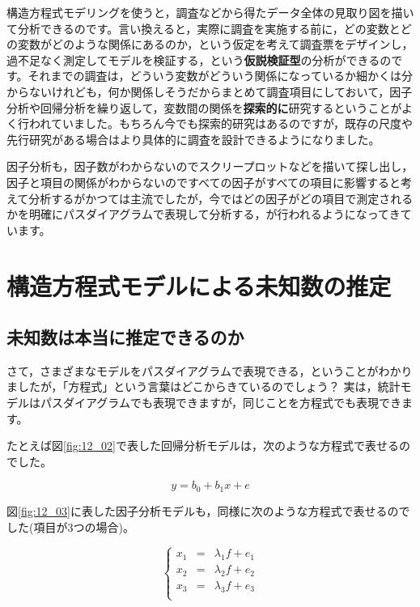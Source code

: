 \documentclass{ltjsbook}
\begin{document}
構造方程式モデリングを使うと，調査などから得たデータ全体の見取り図を描いて分析できるのです。言い換えると，実際に調査を実施する前に，どの変数とどの変数がどのような関係にあるのか，という仮定を考えて調査票をデザインし，過不足なく測定してモデルを検証する，という\textbf{仮説検証型}の分析ができるのです。それまでの調査は，どういう変数がどういう関係になっているか細かくは分からないけれども，何か関係しそうだからまとめて調査項目にしておいて，因子分析や回帰分析を繰り返して，変数間の関係を\textbf{探索的に}研究するということがよく行われていました。もちろん今でも探索的研究はあるのですが，既存の尺度や先行研究がある場合はより具体的に調査を設計できるようになりました。

因子分析も，因子数がわからないのでスクリープロットなどを描いて探し出し，因子と項目の関係がわからないのですべての因子がすべての項目に影響すると考えて分析するがかつては主流でしたが，今ではどの因子がどの項目で測定されるかを明確にパスダイアグラムで表現して分析する，が行われるようになってきています。



\section{構造方程式モデルによる未知数の推定}
\subsection{未知数は本当に推定できるのか}
さて，さまざまなモデルをパスダイアグラムで表現できる，ということがわかりましたが，「方程式」という言葉はどこからきているのでしょう？
実は，統計モデルはパスダイアグラムでも表現できますが，同じことを方程式でも表現できます。

たとえば図\ref{fig:12_02}で表した回帰分析モデルは，次のような方程式で表せるのでした。

\[ y = b_0 + b_1 x + e \]

図\ref{fig:12_03}に表した因子分析モデルも，同様に次のような方程式で表せるのでした(項目が3つの場合)。

\[ \left \{
	\begin{array}{rcl}
		x_1 & = & \lambda_1 f + e_1 \\
		x_2 & = & \lambda_2 f + e_2 \\
		x_3 & = & \lambda_3 f + e_3 \\
	\end{array}
	\right .
\]
\end{document}
